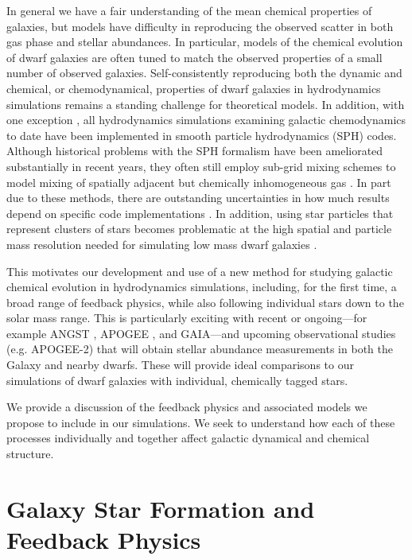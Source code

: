 \documentclass[11pt]{article}
\newcommand{\eg}{e.g.,}
\begin{document}
In general we have a fair understanding of the mean chemical properties of galaxies, but models have difficulty in reproducing the observed scatter in both gas phase and stellar abundances. In particular, models of the chemical evolution of dwarf galaxies are often tuned to match the observed properties of a small number of observed galaxies. Self-consistently reproducing both the dynamic and chemical, or chemodynamical, properties of dwarf galaxies in hydrodynamics simulations remains a standing challenge for theoretical models. In addition, with one exception \citep{Few2012, Few2014}, all hydrodynamics simulations examining galactic chemodynamics to date have been implemented in smooth particle hydrodynamics (SPH) codes. Although historical problems with the SPH formalism have been ameliorated substantially in recent years, they often still employ sub-grid mixing schemes to model mixing of spatially adjacent but chemically inhomogeneous gas \citep[\eg][]{ShenWadsleyStinson2010}. In part due to these methods, there are outstanding uncertainties in how much results depend on specific code implementations \citep{Revaz2016}. In addition, using star particles that represent clusters of stars becomes problematic at the high spatial and particle mass resolution needed for simulating low mass dwarf galaxies \citep{Revaz2016}. 

This motivates our development and use of a new method for studying galactic chemical evolution in hydrodynamics simulations, including, for the first time, a broad range of feedback physics, while also following individual stars down to the solar mass range. This is particularly exciting with recent or ongoing---for example ANGST \citep{ANGST2009}, APOGEE \citep{APOGEE2010}, and GAIA---and upcoming observational studies (e.g. APOGEE-2) that will obtain stellar abundance measurements in both the Galaxy and nearby dwarfs. These will provide ideal comparisons to our simulations of dwarf galaxies with individual, chemically tagged stars.

We provide a discussion of the feedback physics and associated models we propose to include in our simulations. We seek to understand how each of these processes individually and together affect galactic dynamical and chemical structure. 


\section{Galaxy Star Formation and Feedback Physics}
\end{document}
